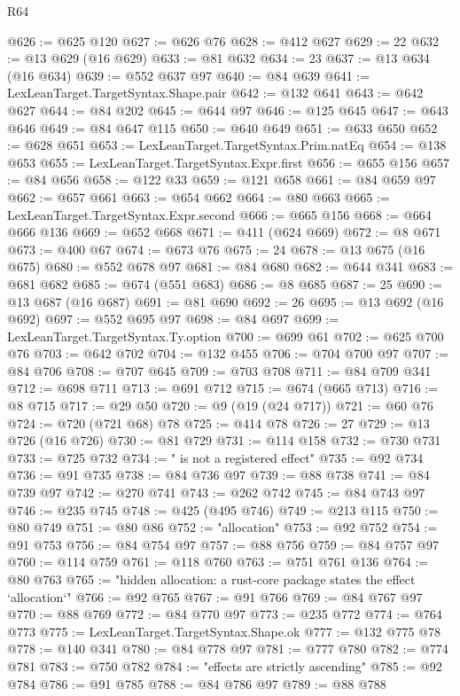 \begin{lexlean}{R64}
\begin{coremodule}
@626 := @625 @120
@627 := @626 @76
@628 := @412 @627
@629 := 22
@632 := @13 @629 (@16 @629)
@633 := @81 @632
@634 := 23
@637 := @13 @634 (@16 @634)
@639 := @552 @637 @97
@640 := @84 @639
@641 := LexLeanTarget.TargetSyntax.Shape.pair
@642 := @132 @641
@643 := @642 @627
@644 := @84 @202
@645 := @644 @97
@646 := @125 @645
@647 := @643 @646
@649 := @84 @647 @115
@650 := @640 @649
@651 := @633 @650
@652 := @628 @651
@653 := LexLeanTarget.TargetSyntax.Prim.natEq
@654 := @138 @653
@655 := LexLeanTarget.TargetSyntax.Expr.first
@656 := @655 @156
@657 := @84 @656
@658 := @122 @33
@659 := @121 @658
@661 := @84 @659 @97
@662 := @657 @661
@663 := @654 @662
@664 := @80 @663
@665 := LexLeanTarget.TargetSyntax.Expr.second
@666 := @665 @156
@668 := @664 @666 @136
@669 := @652 @668
@671 := @411 (@624 @669)
@672 := @8 @671
@673 := @400 @67
@674 := @673 @76
@675 := 24
@678 := @13 @675 (@16 @675)
@680 := @552 @678 @97
@681 := @84 @680
@682 := @644 @341
@683 := @681 @682
@685 := @674 (@551 @683)
@686 := @8 @685
@687 := 25
@690 := @13 @687 (@16 @687)
@691 := @81 @690
@692 := 26
@695 := @13 @692 (@16 @692)
@697 := @552 @695 @97
@698 := @84 @697
@699 := LexLeanTarget.TargetSyntax.Ty.option
@700 := @699 @61
@702 := @625 @700 @76
@703 := @642 @702
@704 := @132 @455
@706 := @704 @700 @97
@707 := @84 @706
@708 := @707 @645
@709 := @703 @708
@711 := @84 @709 @341
@712 := @698 @711
@713 := @691 @712
@715 := @674 (@665 @713)
@716 := @8 @715
@717 := @29 @50
@720 := @9 (@19 (@24 @717))
@721 := @60 @76
@724 := @720 (@721 @68) @78
@725 := @414 @78
@726 := 27
@729 := @13 @726 (@16 @726)
@730 := @81 @729
@731 := @114 @158
@732 := @730 @731
@733 := @725 @732
@734 := " is not a registered effect"
@735 := @92 @734
@736 := @91 @735
@738 := @84 @736 @97
@739 := @88 @738
@741 := @84 @739 @97
@742 := @270 @741
@743 := @262 @742
@745 := @84 @743 @97
@746 := @235 @745
@748 := @425 (@495 @746)
@749 := @213 @115
@750 := @80 @749
@751 := @80 @86
@752 := "allocation"
@753 := @92 @752
@754 := @91 @753
@756 := @84 @754 @97
@757 := @88 @756
@759 := @84 @757 @97
@760 := @114 @759
@761 := @118 @760
@763 := @751 @761 @136
@764 := @80 @763
@765 := "hidden allocation: a rust-core package states the effect `allocation`"
@766 := @92 @765
@767 := @91 @766
@769 := @84 @767 @97
@770 := @88 @769
@772 := @84 @770 @97
@773 := @235 @772
@774 := @764 @773
@775 := LexLeanTarget.TargetSyntax.Shape.ok
@777 := @132 @775 @78
@778 := @140 @341
@780 := @84 @778 @97
@781 := @777 @780
@782 := @774 @781
@783 := @750 @782
@784 := "effects are strictly ascending"
@785 := @92 @784
@786 := @91 @785
@788 := @84 @786 @97
@789 := @88 @788

\end{coremodule}
\end{lexlean}
